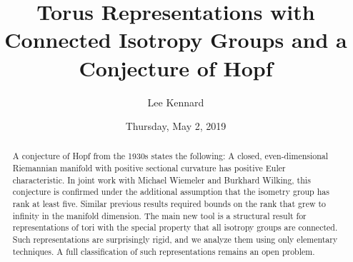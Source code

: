 \documentclass{UAmathtalk}
\author{Lee Kennard}
\title{Torus Representations with Connected Isotropy Groups and a Conjecture of Hopf}
\date{Thursday, May 2, 2019}
\begin{document}
\maketitle

\begin{abstract}
A conjecture of Hopf from the 1930s states the following: A closed, even-dimensional Riemannian manifold with positive sectional curvature has positive Euler characteristic. In joint work with Michael Wiemeler and Burkhard Wilking, this conjecture is confirmed under the additional assumption that the isometry group has rank at least five. Similar previous results required bounds on the rank that grew to infinity in the manifold dimension. The main new tool is a structural result for representations of tori with the special property that all isotropy groups are connected. Such representations are surprisingly rigid, and we analyze them using only elementary techniques. A full classification of such representations remains an open problem.
\end{abstract}
\end{document}
